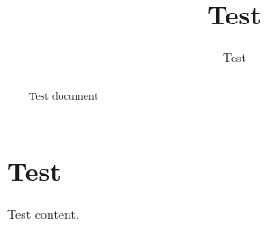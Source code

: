 \documentclass[conference]{IEEEtran}
\begin{document}
\title{Test}
\author{Test}
\maketitle
\begin{abstract}
Test document
\end{abstract}
\section{Test}
Test content.
\end{document}
